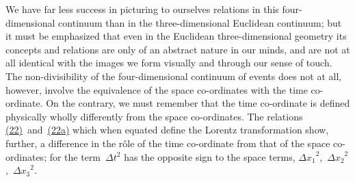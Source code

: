 \documentclass[12pt]{book}[2005/09/16]
\newcommand{\Eqref}[1]{\hyperref[eqn:#1]{#1}}
\begin{document}
We have far less success in picturing to ourselves
relations in this four-dimensional continuum than in the
three-dimensional Euclidean continuum; but it must be
emphasized that even in the Euclidean three-dimensional
geometry its concepts and relations are only of an abstract
nature in our minds, and are not at all identical with the
images we form visually and through our sense of touch.
The non-divisibility of the four-dimensional continuum
of events does not at all, however, involve the equivalence
of the space co-ordinates with the time co-ordinate. On
the contrary, we must remember that the time co-ordinate
is defined physically wholly differently from the space
co-ordinates. The relations \Eqref{(22)}~and~\Eqref{(22a)} which when
equated define the Lorentz transformation show, further,
a difference in the rôle of the time co-ordinate from that
of the space co-ordinates; for the term~$\Delta t^{2}$ has the opposite
sign to the space terms, ${\Delta x_{1}}^{2}$,~${\Delta x_{2}}^{2}$,~${\Delta x_{3}}^{2}$.
\end{document}
